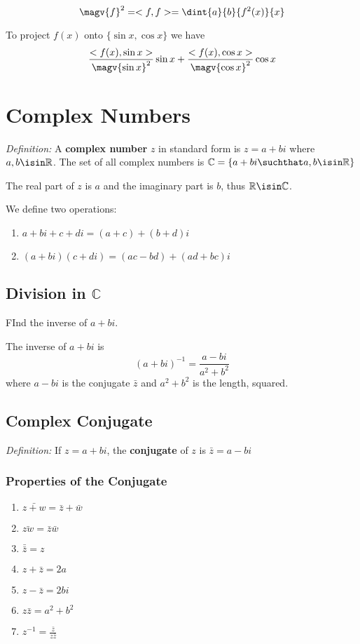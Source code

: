 \documentclass[12pt]{article}
\begin{document}
\[ \magv{f}^2 = <f,f> = \dint{a}{b}{f^2(x)}{x} \]

To project $f(x)$ onto $\{\sin x,\cos x\}$ we have \[ \frac{<f(x),\sin x>}{\magv{\sin x}^2}\sin x + \frac{<f(x),\cos x>}{\magv{\cos x}^2}\cos x \]

\section*{Complex Numbers}

\textit{Definition:} A {\bf complex number} $z$ in standard form is $z = a + bi$ where $a, b \isin \mathbb{R}$. The set of all complex numbers is $\mathbb{C} = \{a + bi \suchthat a, b \isin \mathbb{R}\}$

The real part of $z$ is $a$ and the imaginary part is $b$, thus $\mathbb{R} \isin \mathbb{C}$.

We define two operations:
\begin{enumerate}
\item $a + bi + c + di = (a + c) + (b + d)i$
\item $(a + bi)(c + di) = (ac - bd) + (ad + bc)i$
\end{enumerate}

\subsection*{Division in $\mathbb{C}$}
FInd the inverse of $a + bi$.

The inverse of $a + bi$ is \[ (a + bi)^{-1} = \frac{a - bi}{a^2 + b^2} \] where $a-bi$ is the conjugate $\bar{z}$ and $a^2 + b^2$ is the length, squared.

\subsection*{Complex Conjugate}
\textit{Definition:} If $z = a + bi$, the {\bf conjugate} of $z$ is $\bar{z} = a - bi$

\subsubsection*{Properties of the Conjugate}
\begin{enumerate}
\item $\bar{z+w} = \bar{z} + \bar{w}$
\item $\bar{zw} = \bar{z}\bar{w}$
\item $\bar{\bar{z}} = z$
\item $z + \bar{z} = 2a$
\item $z - \bar{z} = 2bi$
\item $z\bar{z} = a^2 + b^2$
\item $z^{-1} = \frac{\bar{z}}{z\bar{z}}$
\end{enumerate}
\end{document}
